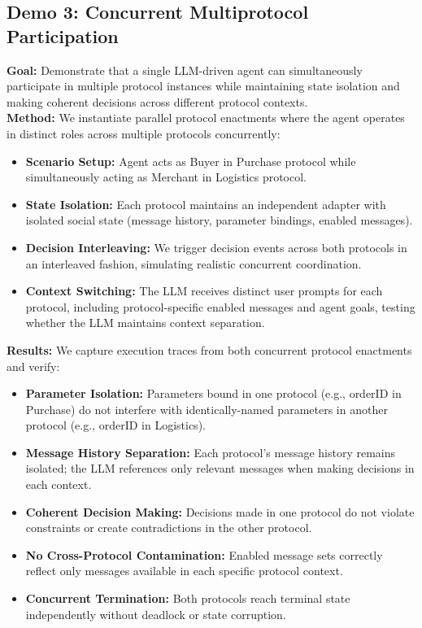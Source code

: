 \documentclass[runningheads]{llncs}
\begin{document}
\subsection{Demo 3: Concurrent Multiprotocol Participation}
\textbf{Goal:} Demonstrate that a single LLM-driven agent can simultaneously participate in multiple protocol instances while maintaining state isolation and making coherent decisions across different protocol contexts.\\
\textbf{Method:} We instantiate parallel protocol enactments where the agent operates in distinct roles across multiple protocols concurrently:
\begin{itemize}
    \item \textbf{Scenario Setup:} Agent acts as Buyer in Purchase protocol while simultaneously acting as Merchant in Logistics protocol.
    \item \textbf{State Isolation:} Each protocol maintains an independent adapter with isolated social state (message history, parameter bindings, enabled messages).
    \item \textbf{Decision Interleaving:} We trigger decision events across both protocols in an interleaved fashion, simulating realistic concurrent coordination.
    \item \textbf{Context Switching:} The LLM receives distinct user prompts for each protocol, including protocol-specific enabled messages and agent goals, testing whether the LLM maintains context separation.
\end{itemize}
\textbf{Results:} We capture execution traces from both concurrent protocol enactments and verify:
\begin{itemize}
    \item \textbf{Parameter Isolation:} Parameters bound in one protocol (e.g., orderID in Purchase) do not interfere with identically-named parameters in another protocol (e.g., orderID in Logistics).
    \item \textbf{Message History Separation:} Each protocol's message history remains isolated; the LLM references only relevant messages when making decisions in each context.
    \item \textbf{Coherent Decision Making:} Decisions made in one protocol do not violate constraints or create contradictions in the other protocol.
    \item \textbf{No Cross-Protocol Contamination:} Enabled message sets correctly reflect only messages available in each specific protocol context.
    \item \textbf{Concurrent Termination:} Both protocols reach terminal state independently without deadlock or state corruption.
\end{itemize}
\end{document}
